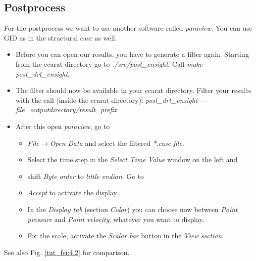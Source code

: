 \subsection{Postprocess}

For the postprocess we want to use another software called \emph{paraview}. You can use GID as in the structural case as well.

\begin{itemize}
\item Before you can open our results, you have to generate a filter again. Starting from the ccarat directory go to \emph{./src/post\_ensight}. Call \emph{make post\_drt\_ensight}.
\item The filter should now be available in your ccarat directory. Filter your results with
the call (inside the ccarat directory): \emph{post\_drt\_ensight -\,-file=outputdirectory/result\_prefix}
\item After this open \emph{paraview}, go to

\begin{itemize}
\item \emph{File$\to$Open Data} and select the filtered \emph{{*}.case
file}.
\item Select the time step in the \emph{Select Time Value} window on the
left and
\item shift \emph{Byte order} to \emph{little endian}. Go to
\item \emph{Accept} to activate the display.
\item In the \emph{Display tab} (section \emph{Color}) you can choose now
between \emph{Point pressure} and \emph{Point velocity}, whatever
you want to display.
\item For the scale, activate the \emph{Scalar bar} button in the \emph{View
section}.
\end{itemize}
\end{itemize}
See also Fig. \ref{tut_fsi:4.2} for comparison.

